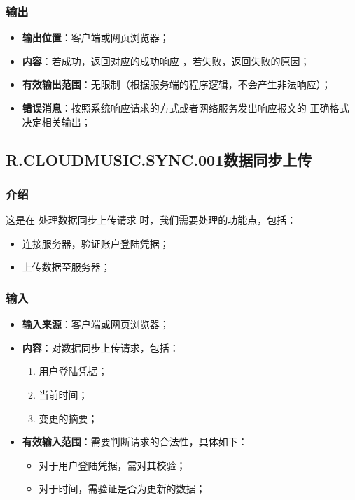 {\subsubsection{输出}
\begin{itemize}
	\item \textbf{输出位置}：客户端或网页浏览器；
	\item \textbf{内容}：若成功，返回对应的成功响应 ，若失败，返回失败的原因；
	\item \textbf{有效输出范围}：无限制（根据服务端的程序逻辑，不会产生非法响应）；
	\item \textbf{错误消息}：按照系统响应请求的方式或者网络服务发出响应报文的
		正确格式决定相关输出；
\end{itemize}
}

\subsection{R.CLOUDMUSIC.SYNC.001数据同步上传}
\subsubsection{介绍}
	这是在 处理数据同步上传请求 时，我们需要处理的功能点，包括：
	\begin{itemize}
		\item 连接服务器，验证账户登陆凭据；
		\item 上传数据至服务器；
	\end{itemize}
\subsubsection{输入}
	\begin{itemize}
		\item \textbf{输入来源}：客户端或网页浏览器；
		\item \textbf{内容}：对数据同步上传请求，包括：
		\begin{enumerate}
			\item 用户登陆凭据；
			\item 当前时间；
			\item 变更的摘要；
		\end{enumerate}
		\item \textbf{有效输入范围}：需要判断请求的合法性，具体如下：
		\begin{itemize}
			\item 对于用户登陆凭据，需对其校验； 
			\item 对于时间，需验证是否为更新的数据； 
		\end{itemize}
	\end{itemize}
